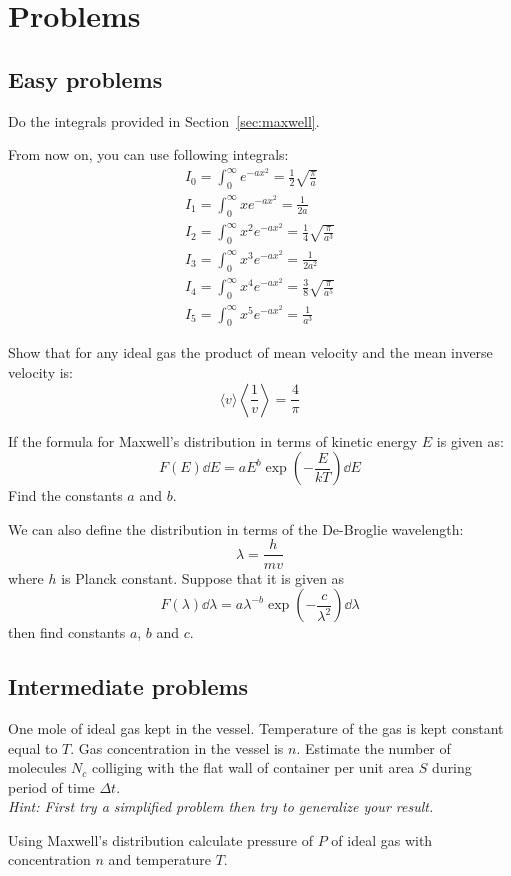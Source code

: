 \documentclass[a4paper, 12pt]{article}
\begin{document}
\section{Problems}
\subsection{Easy problems}
\begin{problem}
    Do the integrals provided in Section~\ref{sec:maxwell}.
\end{problem}

From now on, you can use following integrals:
\begin{align}
    \label{eq:int0}
    I_0=\int_0^\infty e^{-ax^2}=\frac12\sqrt{\frac{\pi}{a}}\\
    \label{eq:int1}
    I_1=\int_0^\infty xe^{-ax^2}=\frac{1}{2a}\\
    \label{eq:int2}
    I_2=\int_0^\infty x^2e^{-ax^2}=\frac{1}{4}\sqrt{\frac{\pi}{a^3}}\\
    \label{eq:int3}
    I_3=\int_0^\infty x^3e^{-ax^2}=\frac{1}{2a^2}\\
    \label{eq:int4}
    I_4=\int_0^\infty x^4e^{-ax^2}=\frac{3}{8}\sqrt{\frac{\pi}{a^5}}\\
    \label{eq:int5}
    I_5=\int_0^\infty x^5e^{-ax^2}=\frac{1}{a^3}
\end{align}
\begin{problem}
    Show that for any ideal gas the product of mean velocity and the mean inverse velocity is:
    $$\langle v\rangle\left<\frac{1}{v}\right> =\frac{4}{\pi}$$
\end{problem}
\begin{problem}
    If the formula for Maxwell's distribution in terms of kinetic energy $E$ is given as:
    $$F(E)\dd E = a E^{b}\exp(-\frac{E}{kT})\dd E$$ Find the constants $a$ and $b$. 
\end{problem}
\begin{problem}
    We can also define the distribution in terms  of the De-Broglie wavelength:
    $$\lambda=\frac{h}{mv}$$
    where $h$ is Planck constant. Suppose that it is given as 
    $$F(\lambda)\dd\lambda=a\lambda^{-b}\exp(-\frac{c}{\lambda^2})\dd \lambda$$
    then find constants $a$, $b$ and $c$.
\end{problem}

\subsection{Intermediate problems}
\begin{problem}
    One mole of ideal gas kept in the vessel. Temperature of the gas is kept constant equal to $T$.
    Gas concentration in the vessel is $n$. Estimate the number of molecules $N_c$ colliging with the flat wall of
    container per unit area $S$ during period of time $\Delta t$. 
\\
    \emph{Hint: First try a simplified problem then try to generalize your result.}
\end{problem}
\begin{problem}
    Using Maxwell's distribution calculate pressure of $P$ of ideal gas with concentration $n$ and temperature $T$.
\end{problem}
\end{document}
